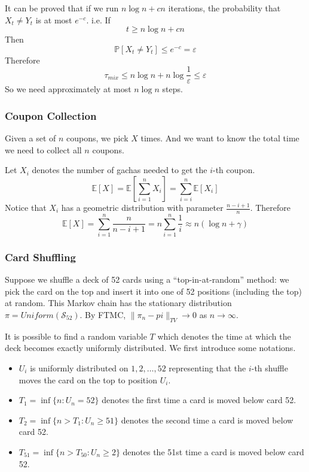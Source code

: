             It can be proved that if we run $n\log n + cn$ iterations, the probability that $X_t \neq Y_t$ is at most $e^{-c}$. i.e.
            If
            \[ t \ge n\log n + cn \]
            Then
            \[ \mathbb{P}[X_t \ne Y_t] \le e^{-c} = \varepsilon \]
            Therefore 
            \[ \tau_{mix} \le n\log n + n\log \frac{1}{\varepsilon} \le \varepsilon\]
            So we need approximately at most $n\log n$ steps.

        \subsubsection{Coupon Collection}
            Given a set of $n$ coupons, we pick $X$ times. And we want to know the total time we need to collect all $n$ coupons.

            Let $X_i$ denotes the number of gachas needed to get the $i$-th coupon.
            \[ \mathbb{E}[X] = \mathbb{E}[\sum_{i=1}^n X_i] = \sum_{i=i}^n \mathbb{E}[X_i] \]
            Notice that $X_i$ has a geometric distribution with parameter $\frac{n-i+1}{n}$. Therefore
            \[ \mathbb{E}[X] = \sum_{i=1}^n \frac{n}{n-i+1} = n\sum_{i=1}^n \frac{1}{i} \approx n(\log n + \gamma) \]

        \subsubsection{Card Shuffling}
            Suppose we shuffle a deck of 52 cards using a ``top-in-at-random'' method: we pick the card on the top and insert it into one of 52 positions (including the top) at random. This Markov chain has the stationary distribution $\pi = Uniform(\mathcal{S}_{52})$. By FTMC, $\|\pi_n - pi\|_{TV} \to 0$ as $n \to \infty$.

            It is possible to find a random variable $T$ which denotes the time at which the deck becomes exactly uniformly distributed. We first introduce some notations.

            \begin{itemize}
                \item $U_i$ is uniformly distributed on $1,2,\dots,52$ representing that the $i$-th shuffle moves the card on the top to position $U_i$.
                \item $T_1 = \inf\{ n: U_n = 52 \}$ denotes the first time a card is moved below card 52.
                \item $T_2 = \inf\{ n>T_1: U_n \ge 51 \}$ denotes the second time a card is moved below card 52.
                \item $T_{51} = \inf\{ n>T_50: U_n \ge 2 \}$ denotes the 51st time a card is moved below card 52.
            \end{itemize}

